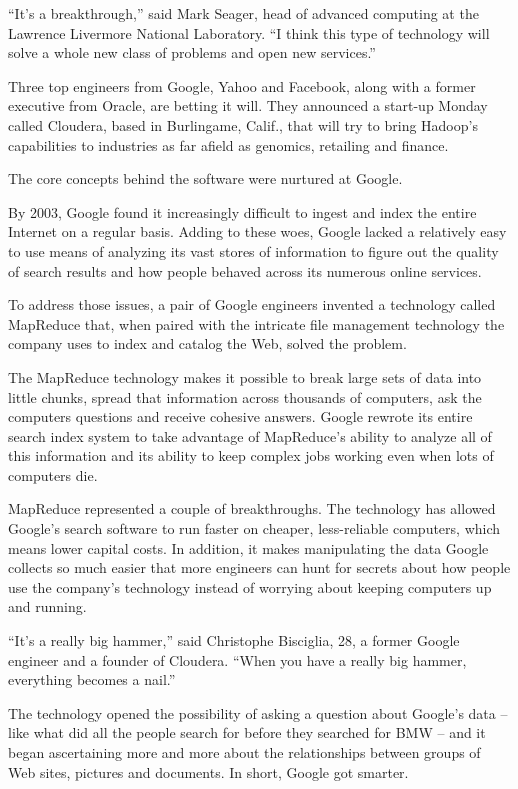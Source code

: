 \documentclass[12pt,a4paper,onecolumn]{article}
\begin{document}
\begin{CJK*}{GBK}{song}
``It's a breakthrough,'' said Mark Seager, head of advanced computing at the Lawrence Livermore
National Laboratory. ``I think this type of technology will solve a whole new class of problems and
open new services.''

Three top engineers from Google, Yahoo and Facebook, along with a former executive from Oracle, are
betting it will. They announced a start-up Monday called Cloudera, based in Burlingame, Calif., that
will try to bring Hadoop's capabilities to industries as far afield as genomics, retailing and
finance.

The core concepts behind the software were nurtured at Google.

By 2003, Google found it increasingly difficult to ingest and index the entire Internet on a regular
basis. Adding to these woes, Google lacked a relatively easy to use means of analyzing its vast
stores of information to figure out the quality of search results and how people behaved across its
numerous online services.

To address those issues, a pair of Google engineers invented a technology called MapReduce that,
when paired with the intricate file management technology the company uses to index and catalog the
Web, solved the problem.

The MapReduce technology makes it possible to break large sets of data into little chunks, spread
that information across thousands of computers, ask the computers questions and receive cohesive
answers. Google rewrote its entire search index system to take advantage of MapReduce's ability to
analyze all of this information and its ability to keep complex jobs working even when lots of
computers die.

MapReduce represented a couple of breakthroughs. The technology has allowed Google's search software
to run faster on cheaper, less-reliable computers, which means lower capital costs. In addition, it
makes manipulating the data Google collects so much easier that more engineers can hunt for secrets
about how people use the company's technology instead of worrying about keeping computers up and
running.

``It's a really big hammer,'' said Christophe Bisciglia, 28, a former Google engineer and a founder
of Cloudera. ``When you have a really big hammer, everything becomes a nail.''

The technology opened the possibility of asking a question about Google's data -- like what did all
the people search for before they searched for BMW -- and it began ascertaining more and more about
the relationships between groups of Web sites, pictures and documents. In short, Google got smarter.


\end{CJK*}
\end{document}
